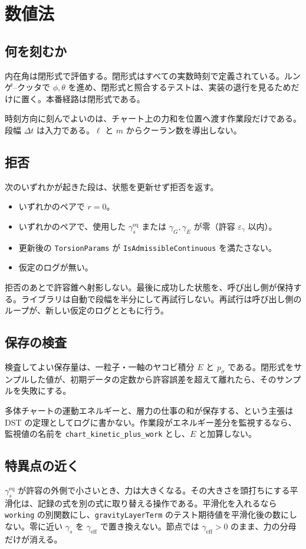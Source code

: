 \section{数値法}
\label{sec:numerics}

\subsection{何を刻むか}

内在角は閉形式で評価する。閉形式はすべての実数時刻で定義されている。ルンゲ--クッタで \(\phi,\theta\) を進め、閉形式と照合するテストは、実装の退行を見るためだけに置く。本番経路は閉形式である。

時刻方向に刻んでよいのは、チャート上の力和を位置へ渡す作業段だけである。段幅 \(\Delta t\) は入力である。\(\ell\) と \(m\) からクーラン数を導出しない。

\subsection{拒否}

次のいずれかが起きた段は、状態を更新せず拒否を返す。

\begin{itemize}
\item いずれかのペアで \(r=0\)。
\item いずれかのペアで、使用した \(\gamma_s^{\mathrm{eq}}\) または \(\gamma_G,\gamma_E\) が零（許容 \(\varepsilon_\gamma\) 以内）。
\item 更新後の \texttt{TorsionParams} が \texttt{IsAdmissibleContinuous} を満たさない。
\item 仮定のログが無い。
\end{itemize}

拒否のあとで許容錐へ射影しない。最後に成功した状態を、呼び出し側が保持する。ライブラリは自動で段幅を半分にして再試行しない。再試行は呼び出し側のループが、新しい仮定のログとともに行う。

\subsection{保存の検査}

検査してよい保存量は、一粒子・一軸のヤコビ積分 \(E\) と \(p_\sigma\) である。閉形式をサンプルした値が、初期データの定数から許容誤差を超えて離れたら、そのサンプルを失敗にする。

多体チャートの運動エネルギーと、層力の仕事の和が保存する、という主張は DST の定理としてログに書かない。作業段がエネルギー差分を監視するなら、監視値の名前を \texttt{chart\_kinetic\_plus\_work} とし、\(E\) と加算しない。

\subsection{特異点の近く}

\(\gamma_s^{\mathrm{eq}}\) が許容の外側で小さいとき、力は大きくなる。その大きさを頭打ちにする平滑化は、記録の式を別の式に取り替える操作である。平滑化を入れるなら \texttt{working} の別関数にし、\texttt{gravityLayerTerm} のテスト期待値を平滑化後の数にしない。零に近い \(\gamma_s\) を \(\gamma_{\mathrm{eff}}\) で置き換えない。節点では \(\gamma_{\mathrm{eff}}>0\) のまま、力の分母だけが消える。
